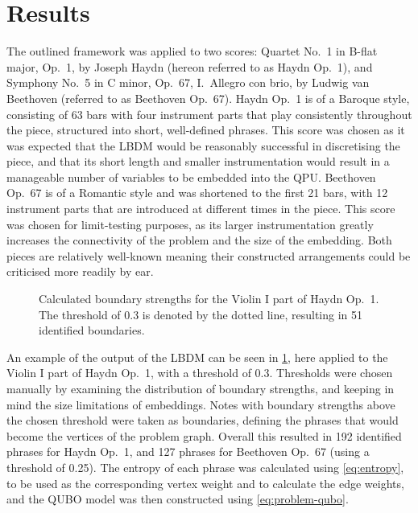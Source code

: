 \documentclass[12pt]{article}
\theoremstyle{definition}
\begin{document}
\section{Results}

The outlined framework was applied to two scores: Quartet No.\ 1 in B-flat major, Op.\ 1, by Joseph Haydn (hereon referred to as Haydn Op.\ 1), and Symphony No.\ 5 in C minor, Op.\ 67, I.\ Allegro con brio, by Ludwig van Beethoven (referred to as Beethoven Op.\ 67). Haydn Op.\ 1 is of a Baroque style, consisting of 63 bars with four instrument parts that play consistently throughout the piece, structured into short, well-defined phrases. This score was chosen as it was expected that the LBDM would be reasonably successful in discretising the piece, and that its short length and smaller instrumentation would result in a manageable number of variables to be embedded into the QPU. Beethoven Op.\ 67 is of a Romantic style and was shortened to the first 21 bars, with 12 instrument parts that are introduced at different times in the piece. This score was chosen for limit-testing purposes, as its larger instrumentation greatly increases the connectivity of the problem and the size of the embedding. Both pieces are relatively well-known meaning their constructed arrangements could be criticised more readily by ear.

\begin{figure}[!b]
    \centering\footnotesize
    
    \caption{Calculated boundary strengths for the Violin I part of Haydn Op.\ 1. The threshold of \num{0.3} is denoted by the dotted line, resulting in \num{51} identified boundaries.}
    \label{fig:phrase-extraction}
\end{figure}

An example of the output of the LBDM can be seen in \cref{fig:phrase-extraction}, here applied to the {Violin I} part of Haydn Op.\ 1, with a threshold of \num{0.3}. Thresholds were chosen manually by examining the distribution of boundary strengths, and keeping in mind the size limitations of embeddings. Notes with boundary strengths above the chosen threshold were taken as boundaries, defining the phrases that would become the vertices of the problem graph. Overall this resulted in \num{192} identified phrases for Haydn Op.\ 1, and \num{127} phrases for Beethoven Op.\ 67 (using a threshold of \num{0.25}). The entropy of each phrase was calculated using \cref{eq:entropy}, to be used as the corresponding vertex weight and to calculate the edge weights, and the QUBO model was then constructed using \cref{eq:problem-qubo}.
\end{document}
